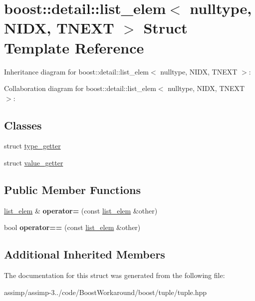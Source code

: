 \hypertarget{structboost_1_1detail_1_1list__elem_3_01nulltype_00_01_n_i_d_x_00_01_t_n_e_x_t_01_4}{\section{boost\+:\+:detail\+:\+:list\+\_\+elem$<$ nulltype, N\+I\+D\+X, T\+N\+E\+X\+T $>$ Struct Template Reference}
\label{structboost_1_1detail_1_1list__elem_3_01nulltype_00_01_n_i_d_x_00_01_t_n_e_x_t_01_4}
}


Inheritance diagram for boost\+:\+:detail\+:\+:list\+\_\+elem$<$ nulltype, N\+I\+D\+X, T\+N\+E\+X\+T $>$\+:


Collaboration diagram for boost\+:\+:detail\+:\+:list\+\_\+elem$<$ nulltype, N\+I\+D\+X, T\+N\+E\+X\+T $>$\+:
\subsection*{Classes}
\begin{DoxyCompactItemize}
\item 
struct \hyperlink{structboost_1_1detail_1_1list__elem_3_01nulltype_00_01_n_i_d_x_00_01_t_n_e_x_t_01_4_1_1type__getter}{type\+\_\+getter}
\item 
struct \hyperlink{structboost_1_1detail_1_1list__elem_3_01nulltype_00_01_n_i_d_x_00_01_t_n_e_x_t_01_4_1_1value__getter}{value\+\_\+getter}
\end{DoxyCompactItemize}
\subsection*{Public Member Functions}
\begin{DoxyCompactItemize}
\item 
\hypertarget{structboost_1_1detail_1_1list__elem_3_01nulltype_00_01_n_i_d_x_00_01_t_n_e_x_t_01_4_ad54a363f6e29e413958a2ad95e6dfc0d}{\hyperlink{structboost_1_1detail_1_1list__elem}{list\+\_\+elem} \& {\bfseries operator=} (const \hyperlink{structboost_1_1detail_1_1list__elem}{list\+\_\+elem} \&other)}\label{structboost_1_1detail_1_1list__elem_3_01nulltype_00_01_n_i_d_x_00_01_t_n_e_x_t_01_4_ad54a363f6e29e413958a2ad95e6dfc0d}

\item 
\hypertarget{structboost_1_1detail_1_1list__elem_3_01nulltype_00_01_n_i_d_x_00_01_t_n_e_x_t_01_4_a7c7bed670a528fe82c7ee013a27e3559}{bool {\bfseries operator==} (const \hyperlink{structboost_1_1detail_1_1list__elem}{list\+\_\+elem} \&other)}\label{structboost_1_1detail_1_1list__elem_3_01nulltype_00_01_n_i_d_x_00_01_t_n_e_x_t_01_4_a7c7bed670a528fe82c7ee013a27e3559}

\end{DoxyCompactItemize}
\subsection*{Additional Inherited Members}


The documentation for this struct was generated from the following file\+:\begin{DoxyCompactItemize}
\item 
assimp/assimp-\/3../code/\+Boost\+Workaround/boost/tuple/tuple.\+hpp\end{DoxyCompactItemize}
